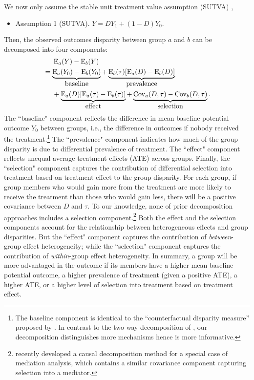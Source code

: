 \documentclass[12pt,a4paper]{article}
\newcommand{\Cov}{\operatorname{Cov}}
\newcommand{\E}{\operatorname{E}}
\begin{document}
We now only assume the stable unit treatment value assumption (SUTVA) \citep{rubin_randomization_1980}, 
\begin{itemize}
     \item[] Assumption 1 (SUTVA). $Y=D Y_1 + (1-D) Y_0$.
\end{itemize}
Then, the observed outcomes disparity between group $a$ and $b$ can be decomposed into four components: 
\begin{align}
&\phantom{{}={}} \E_a(Y)-\E_b(Y)   \nonumber  \\
&= \underbrace{ \E_a(Y_{0})-\E_b(Y_{0}) }_{\text{\normalsize baseline}}
+ \underbrace{\E_b(\tau) [\E_a(D)-\E_b(D)]}_{\text{\normalsize prevalence}} \nonumber  \\ 
&\phantom{{}={}} + \underbrace{\E_a(D)[ \E_a(\tau) - \E_b(\tau) ]}_{\text{\normalsize effect}} 
+ \underbrace{\Cov_a(D, \tau) -  \Cov_b(D, \tau)}_{\text{\normalsize  selection}}. \label{eqt1}
\end{align}
The ``baseline" component reflects the difference in mean baseline potential outcome $Y_0$ between groups, i.e., the difference in outcomes if nobody received the treatment.\footnote{The baseline component is identical to the ``counterfactual disparity measure'' proposed by \citet{naimi_mediation_2016}. In contrast to the two-way decomposition of \citet{naimi_mediation_2016}, our decomposition distinguishes more mechanisms hence is more informative.} The ``prevalence" component indicates how much of the group disparity is due to differential prevalence of treatment. The ``effect" component reflects unequal average treatment effects (ATE) across groups. Finally, the ``selection" component captures the contribution of differential selection into treatment based on treatment effect to the group disparity. 
For each group, if group members who would gain more from the treatment are more likely to receive the treatment than those who would gain less, there will be a positive covariance between $D$ and $\tau$. To our knowledge, none of prior decomposition approaches includes a selection component.\footnote{\citet{zhou_attendance_2022} recently developed a causal decomposition method for a special case of mediation analysis, which contains a similar covariance component capturing selection into a mediator.} 
Both the effect and the selection components account for the relationship between heterogeneous effects and group disparities. But the ``effect" component captures the contribution of \emph{between}-group effect heterogeneity; while the ``selection" component captures the contribution of \emph{within}-group effect heterogeneity. In summary, a group will be more advantaged in the outcome if its members have a higher mean baseline potential outcome, a higher prevalence of treatment (given a positive ATE), a higher ATE, or a higher level of selection into treatment based on treatment effect.
\end{document}
